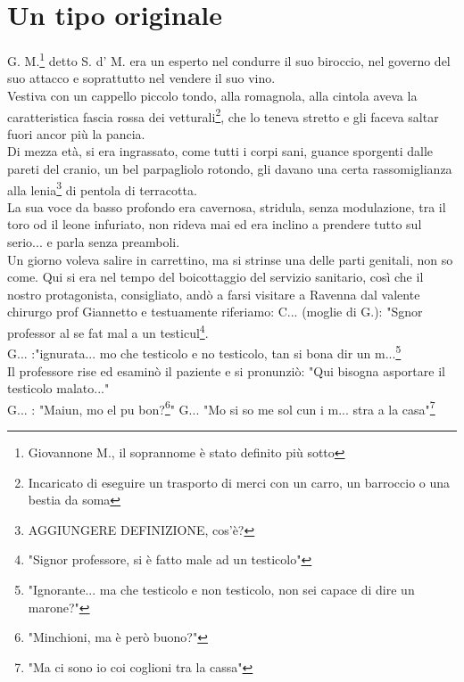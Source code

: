 \documentclass[10pt]{memoir} %
\begin{document}
\chapter{Un tipo originale} 
G. M.\footnote{Giovannone M., il soprannome è stato definito più sotto} detto S. d' M. era un esperto nel condurre il suo biroccio, nel governo del suo attacco e soprattutto nel vendere il suo vino. \\
Vestiva con un cappello piccolo tondo, alla romagnola, alla cintola aveva la caratteristica fascia rossa dei vetturali\footnote{Incaricato di eseguire un trasporto di merci con un carro, un barroccio o una bestia da soma}, che lo teneva stretto e gli faceva saltar fuori ancor più la pancia.\\
Di mezza età, si era ingrassato, come tutti i corpi sani, guance sporgenti dalle pareti del cranio, un bel parpagliolo rotondo, gli davano una certa rassomiglianza alla lenia\footnote{AGGIUNGERE DEFINIZIONE, cos'è?} di pentola di terracotta.\\
La sua voce da basso profondo era cavernosa, stridula, senza modulazione, tra il toro od il leone infuriato, non rideva mai ed era inclino a prendere tutto sul serio... e parla senza preamboli.\\
Un giorno voleva salire in carrettino, ma si strinse una delle parti genitali, non so come. Qui si era nel tempo del boicottaggio del servizio sanitario, così che il nostro protagonista, consigliato, andò a farsi visitare a Ravenna dal valente chirurgo prof Giannetto e testuamente riferiamo:
C\:.\:.\:. (moglie di G.): "Sgnor professor al se fat mal a un testicul\footnote{"Signor professore, si è fatto male ad un testicolo"}.\\
G\:.\:.\:. :"ignurata... mo che testicolo e no testicolo, tan si bona dir un m...\footnote{"Ignorante... ma che testicolo e non testicolo, non sei capace di dire un marone?"}\\
Il professore rise ed esaminò il paziente e si pronunziò: "Qui bisogna asportare il testicolo malato..."\\
G\:.\:.\:. : "Maiun, mo el pu bon?\footnote{"Minchioni, ma è però buono?"}"
G\:.\:.\:. "Mo si so me sol cun i m... stra a la casa"\footnote{"Ma ci sono io coi coglioni tra la cassa"}\\
\end{document}

